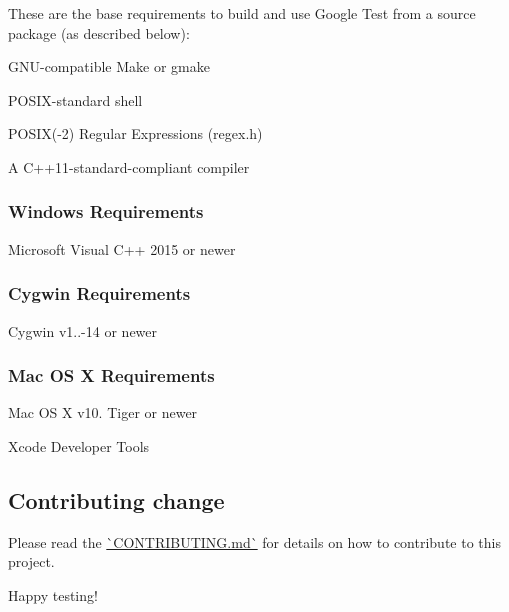 These are the base requirements to build and use Google Test from a source package (as described below)\+:


\begin{DoxyItemize}
\item G\+N\+U-\/compatible Make or gmake
\item P\+O\+S\+I\+X-\/standard shell
\item P\+O\+S\+IX(-\/2) Regular Expressions (regex.\+h)
\item A C++11-\/standard-\/compliant compiler
\end{DoxyItemize}

\subsubsection*{Windows Requirements}


\begin{DoxyItemize}
\item Microsoft Visual C++ 2015 or newer
\end{DoxyItemize}

\subsubsection*{Cygwin Requirements}


\begin{DoxyItemize}
\item Cygwin v1..-\/14 or newer
\end{DoxyItemize}

\subsubsection*{Mac OS X Requirements}


\begin{DoxyItemize}
\item Mac OS X v10. Tiger or newer
\item Xcode Developer Tools
\end{DoxyItemize}

\subsection*{Contributing change}

Please read the \mbox{\hyperlink{_obj__test_2lib_2googletest-release-1_88_81_2_c_o_n_t_r_i_b_u_t_i_n_g_8md}{\`{}\+C\+O\+N\+T\+R\+I\+B\+U\+T\+I\+NG.md\`{}}} for details on how to contribute to this project.

Happy testing! 